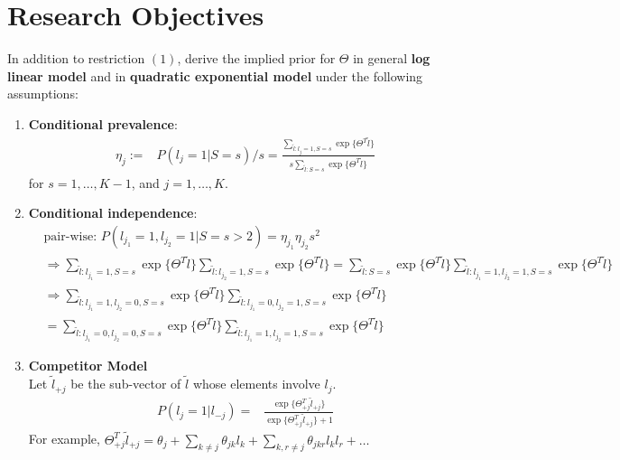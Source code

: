 \documentclass[11 pt, a4paper]{article}  %
\begin{document}
\section{Research Objectives}
In addition to restriction $(1)$, derive the implied prior for $\Theta$ in general \textbf{log linear model} and in \textbf{quadratic exponential model} under the following assumptions:
\begin{enumerate}
\item \textbf{Conditional prevalence}: 
\begin{align}
\eta_j := & P(l_j = 1|S=s)/s = \frac{\sum_{\tilde{l}:l_j=1,S=s}\exp \{ \Theta^T \tilde{l}\}}{s\sum_{\tilde{l}:S=s}\exp \{ \Theta^T \tilde{l}\}} 
\end{align}
for $s=1,\ldots,K-1$, and $j=1,\ldots,K$.

\item \textbf{Conditional independence}:
\begin{align}
& \text{pair-wise: }  P(l_{j_1}=1,l_{j_2}=1|S=s>2) = \eta_{j_1} \eta_{j_2} s^2\\
& \Rightarrow  \sum_{\tilde{l}:l_{j_1}=1,S=s}\exp \{ \Theta^T \tilde{l}\} \sum_{\tilde{l}:l_{j_2}=1,S=s}\exp \{ \Theta^T \tilde{l}\} = 
\sum_{\tilde{l}:S=s}\exp \{ \Theta^T \tilde{l}\} \sum_{\tilde{l}:l_{j_1}=1,l_{j_2}=1,S=s}\exp \{ \Theta^T \tilde{l}\} \nonumber \\ 
& \Rightarrow \sum_{\tilde{l}:l_{j_1}=1,l_{j_2}=0,S=s}\exp \{ \Theta^T \tilde{l}\} \sum_{\tilde{l}:l_{j_1}=0,l_{j_2}=1,S=s}\exp \{ \Theta^T \tilde{l}\} \nonumber \\
& = \sum_{\tilde{l}:l_{j_1}=0,l_{j_2}=0,S=s}\exp \{ \Theta^T \tilde{l}\} \sum_{\tilde{l}:l_{j_1}=1,l_{j_2}=1,S=s}\exp \{ \Theta^T \tilde{l}\}
\end{align}


\item \textbf{Competitor Model}\\
Let $\tilde{l}_{+j}$ be the sub-vector of $\tilde{l}$ whose elements involve $l_j$.
\begin{align}
P(l_j=1|l_{-j}) = & \frac{\exp\{\Theta_{+j}^T \tilde{l}_{+j}\}}{\exp\{\Theta_{+j}^T \tilde{l}_{+j}\}+1}
\end{align}
For example, $\Theta_{+j}^T \tilde{l}_{+j} = \theta_j + \sum_{k\neq j}\theta_{jk}l_k + \sum_{k,r \neq j} \theta_{jkr}l_kl_r + \ldots$
\end{enumerate}

%
\end{document}
